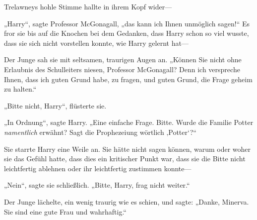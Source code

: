 Trelawneys hohle Stimme hallte in ihrem Kopf wider—


„Harry“, sagte Professor McGonagall, „das kann ich Ihnen unmöglich sagen!“ Es fror sie bis auf die Knochen bei dem Gedanken, dass Harry schon so viel wusste, dass sie sich nicht vorstellen konnte, wie Harry gelernt hat—

Der Junge sah sie mit seltsamen, traurigen Augen an. „Können Sie nicht ohne Erlaubnis des Schulleiters niesen, Professor McGonagall? Denn ich verspreche Ihnen, dass ich guten Grund habe, zu fragen, und guten Grund, die Frage geheim zu halten.“

„Bitte nicht, Harry“, flüsterte sie.

„In Ordnung“, sagte Harry. „Eine einfache Frage. Bitte. Wurde die Familie Potter \emph{namentlich} erwähnt? Sagt die Prophezeiung wörtlich ‚Potter‘?“

Sie starrte Harry eine Weile an. Sie hätte nicht sagen können, warum oder woher sie das Gefühl hatte, dass dies ein kritischer Punkt war, dass sie die Bitte nicht leichtfertig ablehnen oder ihr leichtfertig zustimmen konnte—

„Nein“, sagte sie schließlich. „Bitte, Harry, frag nicht weiter.“

Der Junge lächelte, ein wenig traurig wie es schien, und sagte: „Danke, Minerva. Sie sind eine gute Frau und wahrhaftig.“

